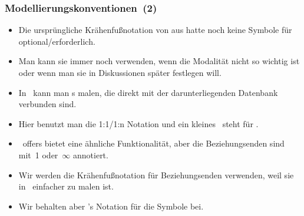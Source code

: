 \documentclass[aspectratio=169,mathserif,notheorems]{beamer}%
\begin{document}
\begin{frame}[t]%
\frametitle{Modellierungskonventionen~(2)}%
\begin{itemize}%
\item Die ursprüngliche Krähenfußnotation von \citeauthor{E1976BDSMEWACE} aus \citeyear{E1976BDSMEWACE} hatte noch keine Symbole für optional/erforderlich\cite{E1976BDSMEWACE}.%
\item<2-> Man kann sie immer noch verwenden, wenn die Modalität nicht so wichtig ist oder wenn man sie in Diskussionen später festlegen will.%
%
\item<3-> In \libreofficeBase\ kann man s malen, die direkt mit der darunterliegenden Datenbank verbunden sind.%
%
\item<4-> Hier benutzt man die 1:1/1:n Notation und ein kleines~ steht für .%
%
\item<5-> \microsoftAccess\ offers bietet eine ähnliche Funktionalität, aber die Beziehungsenden sind mit~1 oder~$\infty$ annotiert.%
%
\item<6-> Wir werden die Krähenfußnotation für Beziehungsenden verwenden, weil sie in \yEd\ einfacher zu malen ist.%
%
\item<7-> Wir behalten aber \citeauthor{C1976TERMTAUVOD}'s Notation für die Symbole bei.%
%
\end{itemize}%
%
%
%
\end{frame}%
%
\end{document}
